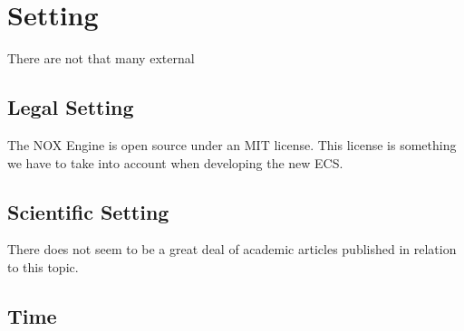 \section*{Setting}
There are not that many external 

\subsection*{Legal Setting}
The NOX Engine is open source under an MIT license. 
This license is something we have to take into account when developing the new ECS.

\subsection*{Scientific Setting}
There does not seem to be a great deal of academic articles published in relation to this topic.

\subsection*{Time}